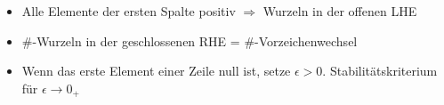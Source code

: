 \begin{tcolorbox}[colback=white!10!white,colframe=green!30!black,title=Routh Kriterium]
    \begin{itemize}
        \item Alle Elemente der ersten Spalte positiv $\Rightarrow$ Wurzeln in der offenen LHE                
        \item $\#$-Wurzeln  in der geschlossenen RHE   = $\#$-Vorzeichenwechsel 
        \item Wenn das erste Element einer Zeile null ist, setze $\epsilon > 0$. Stabilitätskriterium für $\epsilon \rightarrow 0_+$
    \end{itemize}
\end{tcolorbox}
